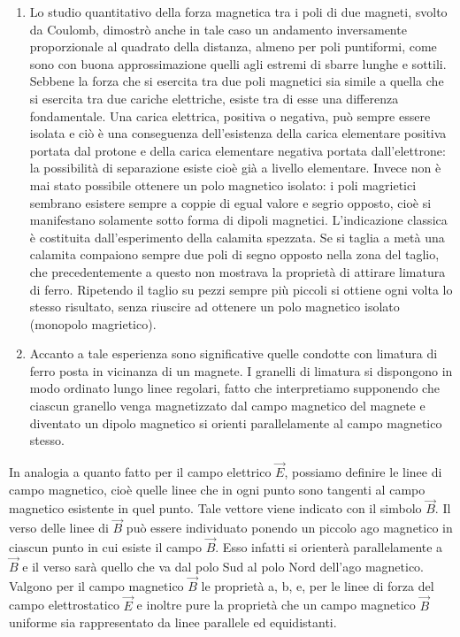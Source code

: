 \documentclass[class=book, crop=false, oneside, 12pt]{standalone}
\begin{document}
\begin{enumerate}
    \item Lo studio quantitativo della forza magnetica tra i poli di due magneti, svolto da Coulomb, dimostrò anche in tale caso un andamento inversamente proporzionale al quadrato della distanza, almeno per poli puntiformi, come sono con buona approssimazione quelli agli estremi di sbarre lunghe e sottili. 
    Sebbene la forza che si esercita tra due poli magnetici sia simile a quella che si esercita tra due cariche elettriche, esiste tra di esse una differenza fondamentale. 
    Una carica elettrica, positiva o negativa, può sempre essere isolata e ciò è una conseguenza dell'esistenza della carica elementare positiva portata dal protone e della carica elementare negativa portata dall'elettrone: la possibilità di separazione esiste cioè già a livello elementare. 
    Invece non è mai stato possibile ottenere un polo magnetico isolato: i poli magrietici sembrano esistere sempre a coppie di egual valore e segrio opposto, cioè si manifestano solamente sotto forma di dipoli magnetici. 
    L'indicazione classica è costituita dall'esperimento della calamita spezzata. 
    Se si taglia a metà una calamita compaiono sempre due poli di segno opposto nella zona del taglio, che precedentemente a questo non mostrava la proprietà di attirare limatura di ferro. 
    Ripetendo il taglio su pezzi sempre più piccoli si ottiene ogni volta lo stesso risultato, senza riuscire ad ottenere un polo magnetico isolato (monopolo magrietico). 
    \item Accanto a tale esperienza sono significative quelle condotte con limatura di ferro posta in vicinanza di un magnete. 
    I granelli di limatura si dispongono in modo ordinato lungo linee regolari, fatto che interpretiamo supponendo che ciascun granello venga magnetizzato dal campo magnetico del magnete e diventato un dipolo magnetico si orienti parallelamente al campo magnetico stesso.
\end{enumerate}
In analogia a quanto fatto per il campo elettrico \(\overrightarrow{E}\), possiamo definire le linee di campo magnetico, cioè quelle linee che in ogni punto sono tangenti al campo magnetico esistente in quel punto. 
Tale vettore viene indicato con il simbolo \(\overrightarrow{B}\). 
Il verso delle linee di \(\overrightarrow{B}\) può essere individuato ponendo un piccolo ago magnetico in ciascun punto in cui esiste il campo \(\overrightarrow{B}\). 
Esso infatti si orienterà parallelamente a \(\overrightarrow{B}\) e il verso sarà quello che va dal polo Sud al polo Nord dell'ago magnetico. 
Valgono per il campo magnetico \(\overrightarrow{B}\) le proprietà a, b, e, per le linee di forza del campo elettrostatico \(\overrightarrow{E}\) e inoltre pure la proprietà che un campo magnetico \(\overrightarrow{B}\) uniforme sia rappresentato da linee parallele ed equidistanti. 
\end{document}
